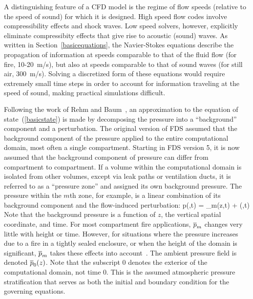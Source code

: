 \documentclass[11pt]{book}
\begin{document}
A distinguishing feature of a CFD model is the regime of
flow speeds (relative to the speed of sound) for which it is designed. High
speed flow codes involve compressibility effects and shock waves. Low speed
solvers, however, explicitly eliminate compressibity effects that give rise
to acoustic (sound) waves. As written in Section~\ref{basicequations}, the Navier-Stokes equations describe the
propagation of information at speeds comparable to that of the fluid flow (for fire, 10-20~m/s),
but also at speeds comparable to that of sound waves (for still air,
300~m/s). Solving a discretized form of these equations would require extremely small
time steps in order to account for information traveling at the speed of sound, making
practical simulations difficult.

Following the work of Rehm and Baum~\cite{Rehm:1}, an approximation to the equation of state~(\ref{basicstate}) is made by decomposing the pressure
into a ``background'' component and a perturbation. The original version of FDS assumed that the background component of the pressure
applied to the entire computational domain, most often a single compartment. Starting in FDS version 5, it is now assumed that
the background component of pressure can differ from compartment to compartment. If
a volume within the computational domain is isolated from other volumes, except via leak paths or ventilation ducts, it is referred to as a ``pressure
zone'' and assigned its own background pressure. The pressure within the $m$th zone, for example, is a linear combination
of its background component and the flow-induced perturbation:
\be p(\bx,t) = \bp_m(z,t) + \tp(\bx,t) \ee
Note that the background pressure is a function of $z$, the vertical spatial coordinate, and time. For most
compartment fire applications, $\overline{p}_m$ changes very little with height or time. However, for situations where the pressure
increases due to a fire in a tightly sealed enclosure, or when the height of the domain is significant, $\overline{p}_m$ takes these effects into
account~\cite{Baum:5}. The ambient pressure field is denoted $\overline{p}_0(z)$. Note that the subscript 0 denotes the exterior of the computational domain, not
time 0. This is the assumed atmospheric pressure stratification that serves as both
the initial and boundary condition for the governing equations.
\end{document}
